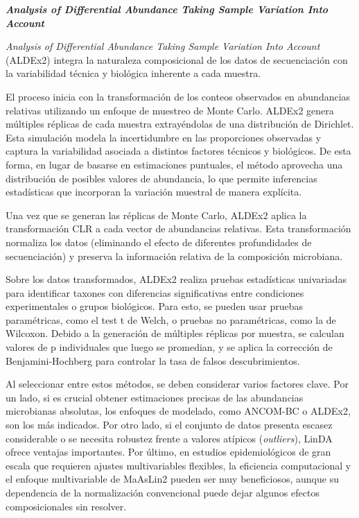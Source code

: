 \textbf{\textit{Analysis of Differential Abundance Taking Sample Variation Into Account}}

\textit{Analysis of Differential Abundance Taking Sample Variation Into Account} (ALDEx2) \cite{fernandes2014unifying} integra la naturaleza composicional de los datos de secuenciación con la variabilidad técnica y biológica inherente a cada muestra.

El proceso inicia con la transformación de los conteos observados en abundancias relativas utilizando un enfoque de muestreo de Monte Carlo. ALDEx2 genera múltiples réplicas de cada muestra extrayéndolas de una distribución de Dirichlet. Esta simulación modela la incertidumbre en las proporciones observadas y captura la variabilidad asociada a distintos factores técnicos y biológicos. De esta forma, en lugar de basarse en estimaciones puntuales, el método aprovecha una distribución de posibles valores de abundancia, lo que permite inferencias estadísticas que incorporan la variación muestral de manera explícita.

Una vez que se generan las réplicas de Monte Carlo, ALDEx2 aplica la transformación CLR a cada vector de abundancias relativas. Esta transformación normaliza los datos (eliminando el efecto de diferentes profundidades de secuenciación) y preserva la información relativa de la composición microbiana.

Sobre los datos transformados, ALDEx2 realiza pruebas estadísticas univariadas para identificar taxones con diferencias significativas entre condiciones experimentales o grupos biológicos. Para esto, se pueden usar pruebas paramétricas, como el test t de Welch, o pruebas no paramétricas, como la de Wilcoxon. Debido a la generación de múltiples réplicas por muestra, se calculan valores de p individuales que luego se promedian, y se aplica la corrección de Benjamini-Hochberg para controlar la tasa de falsos descubrimientos.

Al seleccionar entre estos métodos, se deben considerar varios factores clave. Por un lado, si es crucial obtener estimaciones precisas de las abundancias microbianas absolutas, los enfoques de modelado, como ANCOM-BC o ALDEx2, son los más indicados. Por otro lado, si el conjunto de datos presenta escasez considerable o se necesita robustez frente a valores atípicos (\textit{outliers}), LinDA ofrece ventajas importantes. Por último, en estudios epidemiológicos de gran escala que requieren ajustes multivariables flexibles, la eficiencia computacional y el enfoque multivariable de MaAsLin2 pueden ser muy beneficiosos, aunque su dependencia de la normalización convencional puede dejar algunos efectos composicionales sin resolver.

